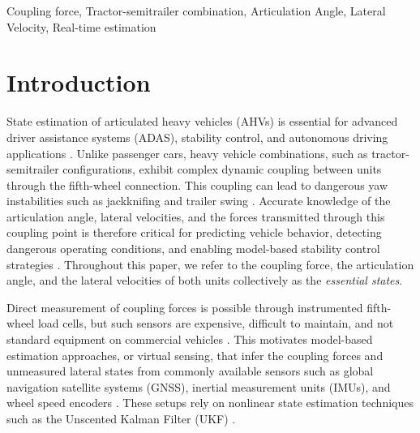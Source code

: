 \documentclass[conference]{IEEEtran}
\begin{document}
\begin{IEEEkeywords}
Coupling force,
Tractor-semitrailer combination, Articulation Angle,
Lateral Velocity, Real-time estimation
\end{IEEEkeywords}
\section{Introduction}

State estimation of articulated heavy vehicles (AHVs) is essential for advanced driver assistance systems (ADAS), stability control, and autonomous driving applications \cite{singh_literature_2019}. Unlike passenger cars, heavy vehicle combinations, such as tractor-semitrailer configurations, exhibit complex dynamic coupling between units through the fifth-wheel connection. This coupling can lead to dangerous yaw instabilities such as jackknifing and trailer swing \cite{erdinc_safe_2023, laine_proposal_2008, bouteldja_prediction_2006}. Accurate knowledge of the articulation angle, lateral velocities, and the forces transmitted through this coupling point is therefore critical for predicting vehicle behavior, detecting dangerous operating conditions, and enabling model-based stability control strategies \cite{habibnejad_korayem_review_2022, cheng_parameter_2011}. Throughout this paper, we refer to the coupling force, the articulation angle, and the lateral velocities of both units collectively as the \emph{essential states}.

Direct measurement of coupling forces is possible through instrumented fifth-wheel load cells, but such sensors are expensive, difficult to maintain, and not standard equipment on commercial vehicles \cite{habibnejad_korayem_estimation_2022}. This motivates model-based estimation approaches, or virtual sensing, that infer the coupling forces and unmeasured lateral states from commonly available sensors such as global navigation satellite systems (GNSS), inertial measurement units (IMUs), and wheel speed encoders \cite{habibnejad_korayem_estimation_2022, ding_event-triggered_2022}. These setups rely on nonlinear state estimation techniques such as the Unscented Kalman Filter (UKF) \cite{julier_new_1997, wan_unscented_2000}.
\end{document}
